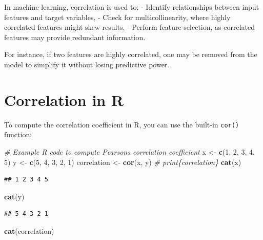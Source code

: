 \documentclass[
  12 pt,
  a4paper,
]{book}
\newenvironment{Shaded}{\begin{snugshade}}{\end{snugshade}}
\newcommand{\CommentTok}[1]{\textcolor[rgb]{0.56,0.35,0.01}{\textit{#1}}}
\newcommand{\DecValTok}[1]{\textcolor[rgb]{0.00,0.00,0.81}{#1}}
\newcommand{\FunctionTok}[1]{\textcolor[rgb]{0.13,0.29,0.53}{\textbf{#1}}}
\newcommand{\NormalTok}[1]{#1}
\newcommand{\OtherTok}[1]{\textcolor[rgb]{0.56,0.35,0.01}{#1}}
\numberwithin{equation}{section}
\theoremstyle{plain}      %
\theoremstyle{definition} %
\theoremstyle{remark}     %
\theoremstyle{note}         %
\begin{document}
In machine learning, correlation is used to: - Identify relationships
between input features and target variables, - Check for
multicollinearity, where highly correlated features might skew results,
- Perform feature selection, as correlated features may provide
redundant information.

For instance, if two features are highly correlated, one may be removed
from the model to simplify it without losing predictive power.

\hypertarget{correlation-in-r}{%
\section{Correlation in R}\label{correlation-in-r}}

To compute the correlation coefficient in R, you can use the built-in
\texttt{cor()} function:

\scriptsize

\begin{Shaded}
\begin{Highlighting}[]
\CommentTok{\# Example R code to compute Pearson\textquotesingle{}s correlation coefficient}
\NormalTok{x }\OtherTok{\textless{}{-}} \FunctionTok{c}\NormalTok{(}\DecValTok{1}\NormalTok{, }\DecValTok{2}\NormalTok{, }\DecValTok{3}\NormalTok{, }\DecValTok{4}\NormalTok{, }\DecValTok{5}\NormalTok{)}
\NormalTok{y }\OtherTok{\textless{}{-}} \FunctionTok{c}\NormalTok{(}\DecValTok{5}\NormalTok{, }\DecValTok{4}\NormalTok{, }\DecValTok{3}\NormalTok{, }\DecValTok{2}\NormalTok{, }\DecValTok{1}\NormalTok{)}
\NormalTok{correlation }\OtherTok{\textless{}{-}} \FunctionTok{cor}\NormalTok{(x, y)}
\CommentTok{\# print\{correlation\}}
\FunctionTok{cat}\NormalTok{(x)}
\end{Highlighting}
\end{Shaded}

\begin{verbatim}
## 1 2 3 4 5
\end{verbatim}

\begin{Shaded}
\begin{Highlighting}[]
\FunctionTok{cat}\NormalTok{(y)}
\end{Highlighting}
\end{Shaded}

\begin{verbatim}
## 5 4 3 2 1
\end{verbatim}

\begin{Shaded}
\begin{Highlighting}[]
\FunctionTok{cat}\NormalTok{(correlation)}
\end{Highlighting}
\end{Shaded}
\end{document}
